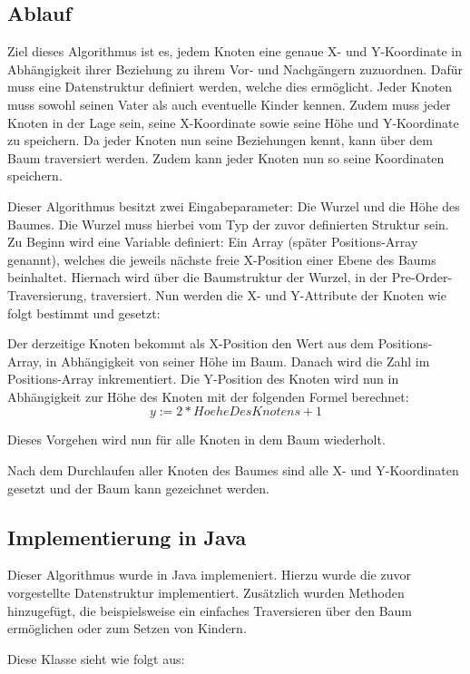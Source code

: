 \label{chap:kapitel3_1_Ablauf}
\subsection{Ablauf}
Ziel dieses Algorithmus ist es, jedem Knoten eine genaue X- und Y-Koordinate in Abhängigkeit ihrer Beziehung zu ihrem Vor- und Nachgängern
zuzuordnen. Dafür muss eine Datenstruktur definiert werden, welche dies ermöglicht. Jeder Knoten muss sowohl seinen Vater als auch eventuelle
Kinder kennen. Zudem muss jeder Knoten in der Lage sein, seine X-Koordinate sowie seine Höhe und Y-Koordinate zu speichern. Da jeder Knoten
nun seine Beziehungen kennt, kann über dem Baum traversiert werden. Zudem kann jeder Knoten nun so seine Koordinaten speichern.

Dieser Algorithmus besitzt zwei Eingabeparameter: Die Wurzel und die Höhe des Baumes.
Die Wurzel muss hierbei vom Typ der zuvor definierten Struktur sein. Zu Beginn wird eine Variable definiert:
Ein Array (später Positions-Array genannt), welches die jeweils nächste freie X-Position einer Ebene des Baums beinhaltet.
Hiernach wird über die Baumstruktur der Wurzel, in der Pre-Order-Traversierung, traversiert.
Nun werden die X- und Y-Attribute der Knoten wie folgt bestimmt und gesetzt:

Der derzeitige Knoten bekommt als X-Position den Wert aus dem Positions-Array, in Abhängigkeit von seiner Höhe im Baum.
Danach wird die Zahl im Positions-Array inkrementiert. Die Y-Position des Knoten wird nun in Abhängigkeit zur Höhe des Knoten
mit der folgenden Formel berechnet: $$y := 2 * HoeheDesKnotens + 1$$

Dieses Vorgehen wird nun für alle Knoten in dem Baum wiederholt. 

Nach dem Durchlaufen aller Knoten des Baumes sind alle X- und Y-Koordinaten gesetzt und der Baum kann gezeichnet werden.

\subsection{Implementierung in Java}
Dieser Algorithmus wurde in Java implemeniert. Hierzu wurde die zuvor vorgestellte Datenstruktur
implementiert. Zusätzlich wurden Methoden hinzugefügt, die beispielsweise
ein einfaches Traversieren über den Baum ermöglichen oder zum Setzen von Kindern.

Diese Klasse sieht wie folgt aus:

